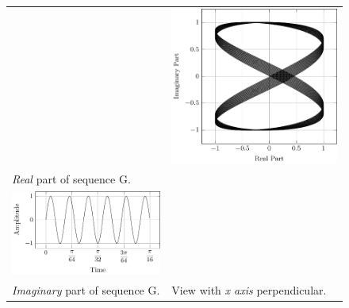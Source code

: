 \documentclass[../../course]{subfiles}
\begin{document}
\begin{figure} [H]
\begin{NiceTabularX} {\textwidth} {
            *{2}{>{\centering\arraybackslash}X}
        }
        &

         {
             {
                \includegraphics[height = \textheight] {tikzpics/plotFrontViewComplexG.pdf}
            }
        }

        \\

         {\emph{Real} part of sequence G.}
        \label{plt:realCmplxG}

        &
        \\

         {
             {
                \includegraphics[height = \textheight] {tikzpics/plotShortX1.pdf}
            }
        }

        &
        \\

         {\emph{Imaginary} part of sequence G.}
        \label{plt:imagCmplxG}

        &

         {View with \emph{x axis} perpendicular.}
        \label{plt:frontViewCmplxG}

        \\

    \end{NiceTabularX}

\end{figure}
\end{document}
